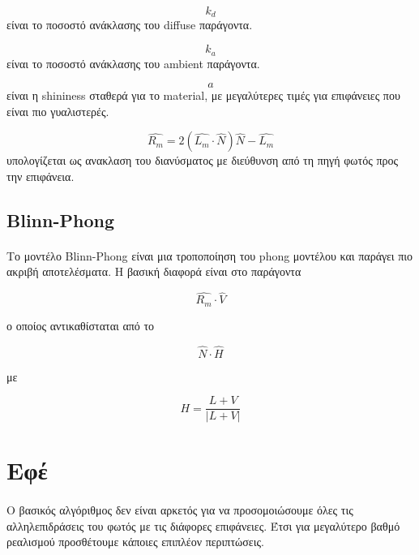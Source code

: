 \begin{sloppypar}
\begin{equation}
k_d
\end{equation}
είναι το ποσοστό ανάκλασης του diffuse παράγοντα.

\begin{equation}
k_a
\end{equation}
είναι το ποσοστό ανάκλασης του ambient παράγοντα.

\begin{equation}
a
\end{equation}
είναι η shininess σταθερά για το material, με μεγαλύτερες τιμές για επιφάνειες που είναι πιο γυαλιστερές.

\begin{equation}
\hat{R_m} = 2(\hat{L_m} \cdot \hat{N}) \hat{N} - \hat{L_m}
\end{equation}
υπολογίζεται ως ανακλαση του διανύσματος με διεύθυνση από τη πηγή φωτός προς την επιφάνεια.

\subsection{Blinn-Phong}
\paragraph{}
	Το μοντέλο Blinn-Phong είναι μια τροποποίηση του phong μοντέλου και παράγει πιο ακριβή αποτελέσματα.
H βασική διαφορά είναι στο παράγοντα

\begin{equation}
\hat{R_m} \cdot \hat{V}
\end{equation}

ο οποίος αντικαθίσταται από το

\begin{equation}
\hat{N} \cdot \hat{H}
\end{equation}

με

\begin{equation}
H = \frac{L + V}{| L + V |}
\end{equation}

\section{Εφέ}
\paragraph{}
	Ο βασικός αλγόριθμος δεν είναι αρκετός για να προσομοιώσουμε όλες τις αλληλεπιδράσεις του
φωτός με τις διάφορες επιφάνειες. Έτσι για μεγαλύτερο βαθμό ρεαλισμού προσθέτουμε κάποιες επιπλέον
περιπτώσεις.


\end{sloppypar}
